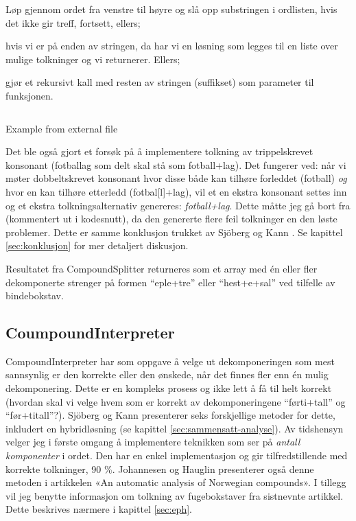 \begin{items}
\item Løp gjennom ordet fra venstre til høyre og slå opp substringen i ordlisten, hvis det ikke gir treff, fortsett, ellers;
\item hvis vi er på enden av stringen, da har vi en løsning som legges til en liste over mulige tolkninger og vi returnerer. Ellers;
\item gjør et rekursivt kall med resten av stringen (suffikset) som parameter til funksjonen.
\end{items}

\begin{listing}
\inputminted[firstline=30,lastline=68,gobble=4,linenos=true,breaklines=true,bgcolor=bar!10,fontsize=\footnotesize]{ruby}{project/hyphenator/lib/hyphenator/compound_splitter.rb}
\caption{Example from external file}
\label{listing:compound-splitter}
\end{listing}
\clearpage

Det ble også gjort et forsøk på å implementere tolkning av trippelskrevet konsonant (fotballag som delt skal stå som fotball+lag).  Det fungerer ved: når vi møter dobbeltskrevet konsonant hvor disse både kan tilhøre forleddet (fotball) \textit{og} hvor en kan tilhøre etterledd (fotbal[l]+lag), vil et en ekstra konsonant settes inn og et ekstra tolkningsalternativ genereres: \textit{fotball+lag}. Dette måtte jeg gå bort fra (kommentert ut i kodesnutt), da den genererte flere feil tolkninger en den løste problemer. Dette er samme konklusjon trukket av Sjöberg og Kann \cite{sjobergh2004finding}. Se kapittel \ref{sec:konklusjon} for mer detaljert diskusjon.

Resultatet fra CompoundSplitter returneres som et array med én eller fler dekomponerte strenger på formen “eple+tre” eller “hest+e+sal” ved tilfelle av bindebokstav.

\subsection{CoumpoundInterpreter}
\label{sec:comp-int}

CompoundInterpreter har som oppgave å velge ut dekomponeringen som mest sannsynlig er den korrekte eller den ønskede, når det finnes fler enn én mulig dekomponering. Dette er en kompleks prosess og ikke lett å få til helt korrekt (hvordan skal vi velge hvem som er korrekt av dekomponeringene “førti+tall” og “før+titall”?). Sjöberg og Kann presenterer seks forskjellige metoder for dette, inkludert en hybridløsning (se kapittel \ref{sec:sammensatt-analyse}). Av tidshensyn velger jeg i første omgang å implementere teknikken som ser på \textit{antall komponenter} i ordet. Den har en enkel implementasjon og gir tilfredstillende med korrekte tolkninger, 90 \%. Johannesen og Hauglin presenterer også denne metoden i artikkelen «An automatic analysis of Norwegian compounds»\cite{johannessen1996automatic}. I tillegg vil jeg benytte informasjon om tolkning av fugebokstaver fra sistnevnte artikkel. Dette beskrives nærmere i kapittel \ref{sec:eph}.

